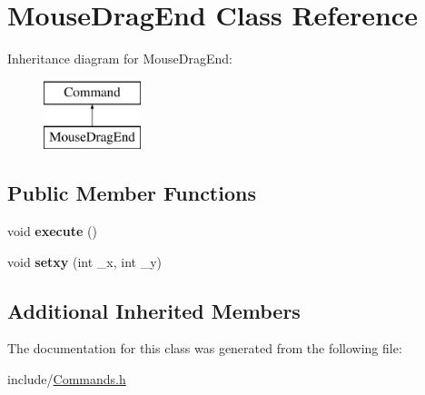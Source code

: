 \hypertarget{classMouseDragEnd}{\section{Mouse\-Drag\-End Class Reference}
\label{classMouseDragEnd}
}
Inheritance diagram for Mouse\-Drag\-End\-:\begin{figure}[H]
\begin{center}
\leavevmode
\includegraphics[height=2.000000cm]{classMouseDragEnd}
\end{center}
\end{figure}
\subsection*{Public Member Functions}
\begin{DoxyCompactItemize}
\item 
\hypertarget{classMouseDragEnd_a63fcd73eca3e643f97d9e35dc0b1238f}{void {\bfseries execute} ()}\label{classMouseDragEnd_a63fcd73eca3e643f97d9e35dc0b1238f}

\item 
\hypertarget{classMouseDragEnd_a8ae2473a78adb5ad4cf85704d5221d6c}{void {\bfseries setxy} (int \-\_\-x, int \-\_\-y)}\label{classMouseDragEnd_a8ae2473a78adb5ad4cf85704d5221d6c}

\end{DoxyCompactItemize}
\subsection*{Additional Inherited Members}


The documentation for this class was generated from the following file\-:\begin{DoxyCompactItemize}
\item 
include/\hyperlink{Commands_8h}{Commands.\-h}\end{DoxyCompactItemize}
